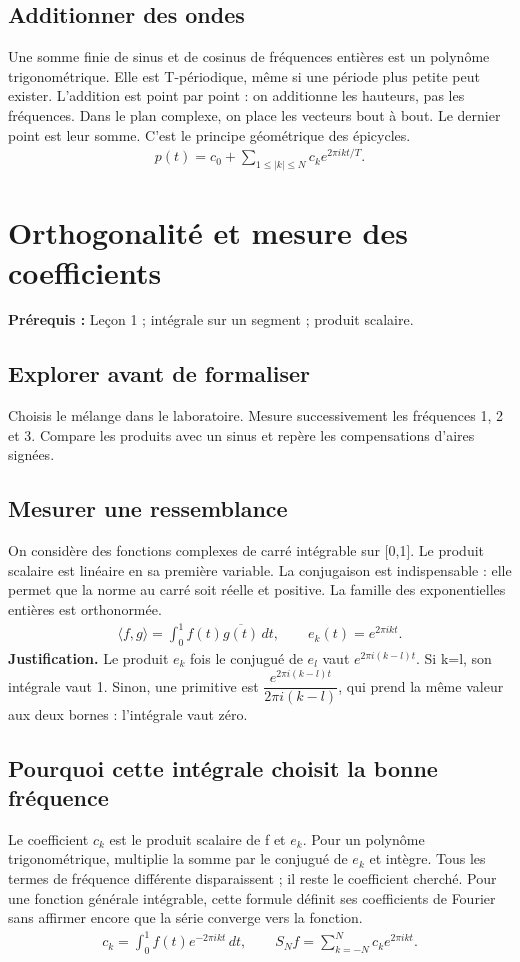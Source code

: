 \documentclass[11pt,a4paper]{article}
\begin{document}
\subsection{Additionner des ondes}
Une somme finie de sinus et de cosinus de fréquences entières est un polynôme trigonométrique. Elle est T-périodique, même si une période plus petite peut exister. L’addition est point par point : on additionne les hauteurs, pas les fréquences. Dans le plan complexe, on place les vecteurs bout à bout. Le dernier point est leur somme. C’est le principe géométrique des épicycles.
\[\begin{gathered}p(t)=c_0+\sum_{1\le |k|\le N} c_k e^{2\pi ikt/T}.\end{gathered}\]
\clearpage
\section{Orthogonalité et mesure des coefficients}
\textbf{Prérequis :} Leçon 1 ; intégrale sur un segment ; produit scalaire.
\subsection*{Explorer avant de formaliser}Choisis le mélange dans le laboratoire. Mesure successivement les fréquences 1, 2 et 3. Compare les produits avec un sinus et repère les compensations d’aires signées.
\subsection{Mesurer une ressemblance}
On considère des fonctions complexes de carré intégrable sur [0,1]. Le produit scalaire est linéaire en sa première variable. La conjugaison est indispensable : elle permet que la norme au carré soit réelle et positive. La famille des exponentielles entières est orthonormée.
\[\begin{gathered}\langle f,g\rangle=\int_0^1 f(t)\overline{g(t)}\,dt,\qquad e_k(t)=e^{2\pi ikt}.\end{gathered}\]
\textbf{Justification.} Le produit $e_k$ fois le conjugué de $e_l$ vaut $e^{2\pi i(k-l)t}$. Si k=l, son intégrale vaut 1. Sinon, une primitive est $\dfrac{e^{2\pi i(k-l)t}}{2\pi i(k-l)}$, qui prend la même valeur aux deux bornes : l’intégrale vaut zéro.
\subsection{Pourquoi cette intégrale choisit la bonne fréquence}
Le coefficient $c_k$ est le produit scalaire de f et $e_k$. Pour un polynôme trigonométrique, multiplie la somme par le conjugué de $e_k$ et intègre. Tous les termes de fréquence différente disparaissent ; il reste le coefficient cherché. Pour une fonction générale intégrable, cette formule définit ses coefficients de Fourier sans affirmer encore que la série converge vers la fonction.
\[\begin{gathered}c_k=\int_0^1 f(t)e^{-2\pi ikt}\,dt,\qquad S_Nf=\sum_{k=-N}^{N}c_ke^{2\pi ikt}.\end{gathered}\]
\end{document}
